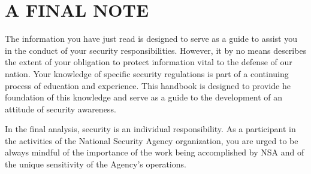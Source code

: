 \documentclass[a4]{article}
\begin{document}
\section{A FINAL NOTE}

The information you have just read is designed to serve as a guide to assist
you in the conduct of your security responsibilities.  However, it by no means
describes the extent of your obligation to protect information vital to the
defense of our nation.  Your knowledge of specific security regulations is part
of a continuing process of education and experience.  This handbook is designed
to provide he foundation of this knowledge and serve as a guide to the
development of an attitude of security awareness.

In the final analysis, security is an individual responsibility.  As a
participant in the activities of the National Security Agency organization, you
are urged to be always mindful of the importance of the work being accomplished
by NSA and of the unique sensitivity of the Agency's operations.
\end{document}
